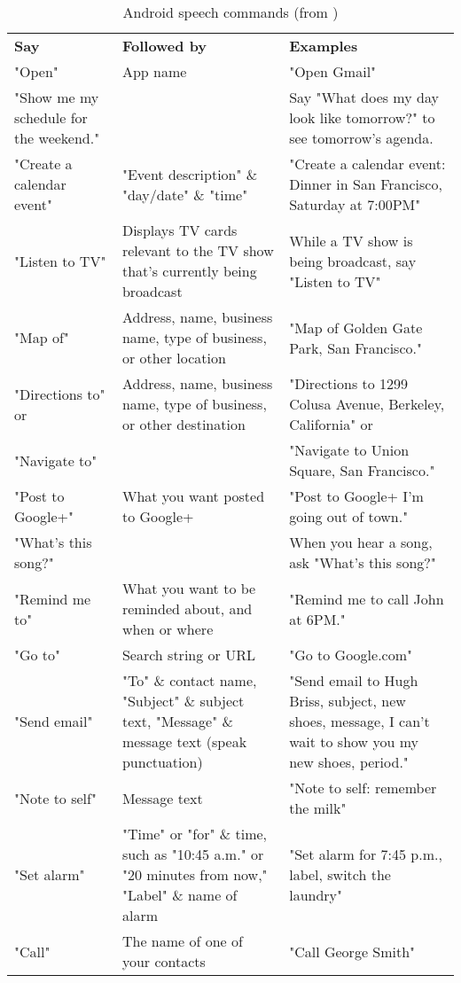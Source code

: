 \begin{table}[htbp]
  \centering
  \caption{Android speech commands (from \cite{googleNow})}
  \label{tab:asc}
 \renewcommand{\arraystretch}{1.2}
    \begin{tabularx}{\textwidth}{p{3cm}|X|X}
    \rowcolor{mygray}
    \textbf{Say} & \textbf{Followed by} & \textbf{Examples} \\
    "Open" & App name & "Open Gmail" \\ \hline
   "Show me my schedule for the weekend." &       & Say "What does my day look like tomorrow?" to see tomorrow's agenda. \\ \hline
    "Create a calendar event" & "Event description" \& "day/date" \& "time" & "Create a calendar event: Dinner in San Francisco, Saturday at 7:00PM" \\ \hline
    "Listen to TV" & Displays TV cards relevant to the TV show that's currently being broadcast & While a TV show is being broadcast, say "Listen to TV" \\ \hline
    "Map of" & Address, name, business name, type of business, or other location & "Map of Golden Gate Park, San Francisco." \\ \hline
    "Directions to" or & Address, name, business name, type of business, or other destination & "Directions to 1299 Colusa Avenue, Berkeley, California" or \\ \hline
    "Navigate to" &       & "Navigate to Union Square, San Francisco." \\ \hline
    "Post to Google+" & What you want posted to Google+ & "Post to Google+ I'm going out of town." \\ \hline
    "What's this song?" &       & When you hear a song, ask "What's this song?" \\ \hline
    "Remind me to" & What you want to be reminded about, and when or where & "Remind me to call John at 6PM." \\ \hline
    "Go to" & Search string or URL & "Go to Google.com" \\ \hline
    "Send email" & "To" \& contact name, "Subject" \& subject text, "Message" \& message text (speak punctuation)  & "Send email to Hugh Briss, subject, new shoes, message, I can’t wait to show you my new shoes, period." \\ \hline
    "Note to self" & Message text & "Note to self: remember the milk" \\ \hline
    "Set alarm" & "Time" or "for" \& time, such as "10:45 a.m." or "20 minutes from now," "Label" \& name of alarm & "Set alarm for 7:45 p.m., label, switch the laundry" \\ \hline
    "Call" & The name of one of your contacts & "Call George Smith" \\ \end{tabularx}%
\end{table}%
